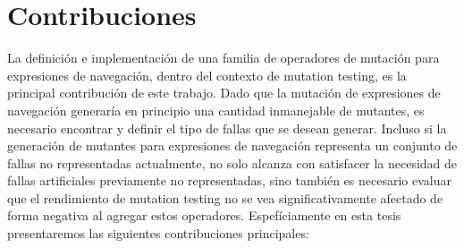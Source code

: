 
\section{Contribuciones}
\label{sec:intro.contribuciones}


La definici\'on e implementaci\'on de una familia de operadores de mutaci\'on para expresiones de navegaci\'on, dentro del contexto de mutation testing, es la principal contribuci\'on de este trabajo. Dado que la mutaci\'on de expresiones de navegaci\'on generar\'ia en principio una cantidad inmanejable de mutantes, es necesario encontrar y definir el tipo de fallas que se desean generar. Incluso si la generaci\'on de mutantes para expresiones de navegaci\'on representa un conjunto de fallas no representadas actualmente, no solo alcanza con satisfacer la necesidad de fallas artificiales previamente no representadas, sino tambi\'en es necesario evaluar que el rendimiento de mutation testing no se vea significativamente afectado de forma negativa al agregar estos operadores. Espef\'iciamente en esta tesis presentaremos las siguientes contribuciones principales:


